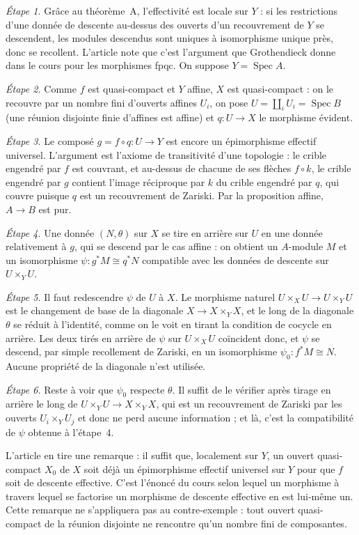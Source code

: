 \documentclass[11pt,a4paper]{amsart}
\theoremstyle{definition}
\theoremstyle{plain}
\theoremstyle{remark}
\newcommand{\Spec}{\operatorname{Spec}}
\begin{document}
\emph{Étape 1.} Grâce au théorème~A, l'effectivité est locale sur $Y$ : si les restrictions d'une donnée de descente au-dessus des ouverts d'un recouvrement de $Y$ se descendent, les modules descendus sont uniques à isomorphisme unique près, donc se recollent. L'article note que c'est l'argument que Grothendieck donne dans le cours pour les morphismes fpqc. On suppose $Y=\Spec A$.

\emph{Étape 2.} Comme $f$ est quasi-compact et $Y$ affine, $X$ est quasi-compact : on le recouvre par un nombre fini d'ouverts affines $U_i$, on pose $U=\coprod_iU_i=\Spec B$ (une réunion disjointe finie d'affines est affine) et $q\colon U\to X$ le morphisme évident.

\emph{Étape 3.} Le composé $g=f\circ q\colon U\to Y$ est encore un épimorphisme effectif universel. L'argument est l'axiome de transitivité d'une topologie : le crible engendré par $f$ est couvrant, et au-dessus de chacune de ses flèches $f\circ k$, le crible engendré par $g$ contient l'image réciproque par $k$ du crible engendré par $q$, qui couvre puisque $q$ est un recouvrement de Zariski. Par la proposition affine, $A\to B$ est pur.

\emph{Étape 4.} Une donnée $(N,\theta)$ sur $X$ se tire en arrière sur $U$ en une donnée relativement à $g$, qui se descend par le cas affine : on obtient un $A$-module $M$ et un isomorphisme $\psi\colon g^*M\cong q^*N$ compatible avec les données de descente sur $U\times_YU$.

\emph{Étape 5.} Il faut redescendre $\psi$ de $U$ à $X$. Le morphisme naturel $U\times_XU\to U\times_YU$ est le changement de base de la diagonale $X\to X\times_YX$, et le long de la diagonale $\theta$ se réduit à l'identité, comme on le voit en tirant la condition de cocycle en arrière. Les deux tirés en arrière de $\psi$ sur $U\times_XU$ coïncident donc, et $\psi$ se descend, par simple recollement de Zariski, en un isomorphisme $\psi_0\colon f^*M\cong N$. Aucune propriété de la diagonale n'est utilisée.

\emph{Étape 6.} Reste à voir que $\psi_0$ respecte $\theta$. Il suffit de le vérifier après tirage en arrière le long de $U\times_YU\to X\times_YX$, qui est un recouvrement de Zariski par les ouverts $U_i\times_YU_j$ et donc ne perd aucune information ; et là, c'est la compatibilité de $\psi$ obtenue à l'étape~4.

L'article en tire une remarque : il suffit que, localement sur $Y$, un ouvert quasi-compact $X_0$ de $X$ soit déjà un épimorphisme effectif universel sur $Y$ pour que $f$ soit de descente effective. C'est l'énoncé du cours selon lequel un morphisme à travers lequel se factorise un morphisme de descente effective en est lui-même un. Cette remarque ne s'appliquera pas au contre-exemple : tout ouvert quasi-compact de la réunion disjointe ne rencontre qu'un nombre fini de composantes.
\end{document}
